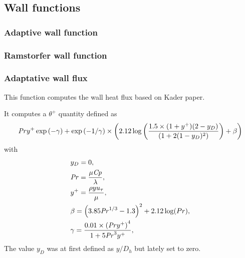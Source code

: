 \subsection{Wall functions}
\subsubsection{Adaptive wall function}
\subsubsection{Ramstorfer wall function}
\subsubsection{Adaptative wall flux}

This function computes the wall heat flux based on Kader paper. 

It computes a $\theta^+$ quantity defined as
\begin{equation}
    \mathit{Pr} y^+ \exp\left( -\gamma \right) + \exp\left( -1/\gamma \right) \times \left( 2.12 \log\left( \frac{1.5 \times (1+y^+) (2-y_D)}{(1+2(1-y_D)^2)} \right) + \beta \right)
\end{equation}
with
\begin{align}
    & y_D = 0,\\
    &\mathit{Pr} = \frac{\mu \mathit{Cp}}{\lambda},\\
    &y^+ = \frac{\rho y u_{\tau}}{\mu},\\
    &\beta = \left( 3.85\mathit{Pr}^{1/3}-1.3 \right)^2 + 2.12\log(Pr),\\
    &\gamma = \frac{0.01\times \left( \mathit{Pr} y^+ \right)^4}{1+5\mathit{Pr}^3y^+},
\end{align}
The value $y_D$ was at first defined as $y/D_h$ but lately set to zero.